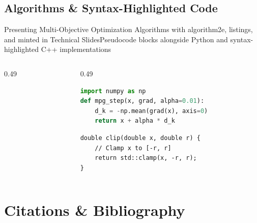 \documentclass[aspectratio=43,10pt]{beamer}
\begin{document}
\subsection{Algorithms \& Syntax-Highlighted Code}
\begin{frame}[fragile]{Presenting Multi-Objective Optimization Algorithms with algorithm2e, listings, and minted in Technical Slides}{Pseudocode blocks alongside Python and syntax-highlighted C++ implementations}
  \begin{columns}[T]
    \begin{column}{0.49\textwidth}
      \begin{minipage}{\linewidth}
      \begin{algorithm}[H]
        \scriptsize
        \caption{MPG-E Algorithm}\label{algo:mpg}
        \BlankLine
      \end{algorithm}
      \end{minipage}
    \end{column}

    \begin{column}{0.49\textwidth}
\begin{lstlisting}[style=hustcode, language=Python]
import numpy as np
def mpg_step(x, grad, alpha=0.01):
    d_k = -np.mean(grad(x), axis=0)
    return x + alpha * d_k
\end{lstlisting}
\vskip -4pt
\label{lst:python}
\vskip 2pt
\begin{verbatim}
double clip(double x, double r) {
    // Clamp x to [-r, r]
    return std::clamp(x, -r, r);
}
\end{verbatim}
\vskip -4pt
\label{lst:cpp}
    \end{column}
  \end{columns}
\end{frame}

\section[Citations]{Citations \& Bibliography}
\end{document}
